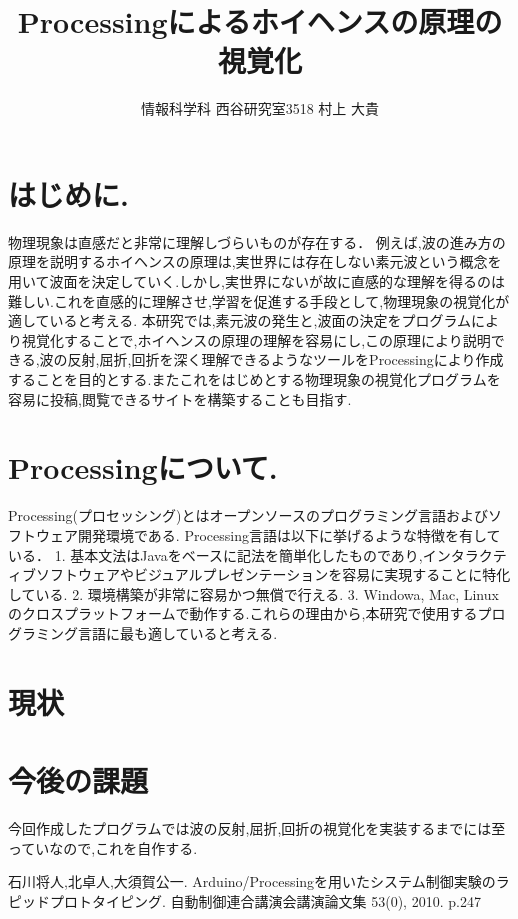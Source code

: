 \documentclass[a4j,twocolumn,uplatex]{jsarticle}
\begin{document}
\title{Processingによるホイヘンスの原理の視覚化}
\author{情報科学科 西谷研究室3518 村上 大貴}
\date{}
\maketitle
\section{はじめに.}
物理現象は直感だと非常に理解しづらいものが存在する．
例えば,波の進み方の原理を説明するホイヘンスの原理は,実世界には存在しない素元波という概念を用いて波面を決定していく.しかし,実世界にないが故に直感的な理解を得るのは難しい.これを直感的に理解させ,学習を促進する手段として,物理現象の視覚化が適していると考える.
本研究では,素元波の発生と,波面の決定をプログラムにより視覚化することで,ホイヘンスの原理の理解を容易にし,この原理により説明できる,波の反射,屈折,回折を深く理解できるようなツールをProcessingにより作成することを目的とする.またこれをはじめとする物理現象の視覚化プログラムを容易に投稿,閲覧できるサイトを構築することも目指す.


\section{Processingについて.}
Processing(プロセッシング)とはオープンソースのプログラミング言語およびソフトウェア開発環境である.\cite{1}
Processing言語は以下に挙げるような特徴を有している．
1. 基本文法はJavaをベースに記法を簡単化したものであり,インタラクティブソフトウェアやビジュアルプレゼンテーションを容易に実現することに特化している.\cite{1}
2. 環境構築が非常に容易かつ無償で行える.
3. Windowa, Mac, Linuxのクロスプラットフォームで動作する.\cite{1}これらの理由から,本研究で使用するプログラミング言語に最も適していると考える.


\section{現状}






\section{今後の課題}
今回作成したプログラムでは波の反射,屈折,回折の視覚化を実装するまでには至っていなので,これを自作する.


\begin{thebibliography}{9}
 石川将人,北卓人,大須賀公一. Arduino/Processingを用いたシステム制御実験のラピッドプロトタイピング. 自動制御連合講演会講演論文集 53(0), 2010. p.247 

\end{thebibliography}
\end{document}
